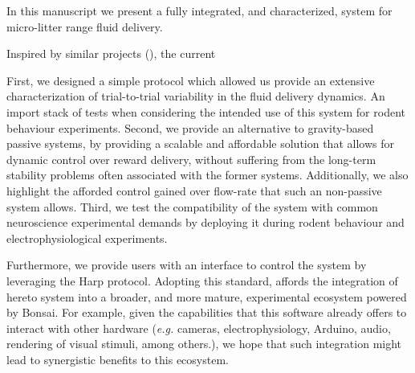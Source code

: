 In this manuscript we present a fully integrated, and characterized, system for micro-litter range fluid delivery.
 
Inspired by similar projects (\citep{Amarante2019, Wijnen2014}), the current 

First, we designed a simple protocol which allowed us provide an extensive characterization of trial-to-trial variability in the fluid delivery dynamics. An import stack of tests when considering the intended use of this system for rodent behaviour experiments.
Second, we provide an alternative to gravity-based passive systems, by providing a scalable and affordable solution that allows for dynamic control over reward delivery, without suffering from the long-term stability problems often associated with the former systems. Additionally, we also highlight the afforded control gained over flow-rate that such an non-passive system allows.
Third, we test the compatibility of the system with common neuroscience experimental demands by deploying it during rodent behaviour and electrophysiological experiments.

Furthermore, we provide users with an interface to control the system by leveraging the Harp protocol. Adopting this standard, affords the integration of hereto system into a broader, and more mature, experimental ecosystem powered by Bonsai. For example, given the capabilities that this software already offers to interact with other hardware (\textit{e.g.} cameras, electrophysiology, Arduino, audio, rendering of visual stimuli, among others.), we hope that such integration might lead to synergistic benefits to this ecosystem. 